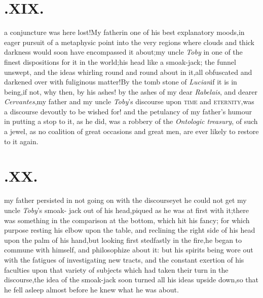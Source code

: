 \documentclass{article}
\begin{document}
\baselineskip

\section{.\quad  XIX.}

\baselineskip

 a conjuncture was\break
here lost!\tsh My father\break in one of his best explanatory
moods,\tsk in eager pursuit of a metaphysic point into the very
regions where clouds and thick darkness would soon have
encompassed it about;\tsk my uncle \textit{Toby} in one of the
finest dispositions for it in the world;\tsk his head like a
smoak-jack;\break
\tsh the funnel unswept, and the ideas
whirling round and round about in it,\break all obfuscated and darkened over with
fuliginous matter!\tsh By the tomb stone of \textit{Lucian}\tsh if it is in
being,\tsh if not, why then, by his ashes! by the ashes of my dear \textit{Rabelais},
and dearer \textit{Cervantes},\break\tsh my father and my uncle \textit{Toby}’s discourse
upon \textsc{time} and \textsc{eternity},\tsk was a discourse devoutly to be wished
for! and the petulancy of my father’s humour in putting a stop to it, as he did, was
a robbery of the \textit{Ontologic treasury}, of such a jewel, as no coalition of
great occasions and great men, are ever likely to restore to it again.

\section{.\quad  XX.}

 my father persisted in not going on
with the discourse\tsk yet he could not get my uncle
\textit{Toby}’s smoak- jack out of his head,\tsk piqued as he was
at first with it;\tsk there was something in the comparison at
the bottom, which hit his fancy; for which purpose resting his
elbow upon the table, and reclining the right side of his head
upon the palm of his hand,\tsh but looking first stedfast\-ly in
the fire,\tsh he began to commune with himself, and philosophize
about it: but his spirits being wore out with the fatigues of
investigating new tracts, and the constant exertion of his
faculties upon that variety of subjects which had taken their
turn in the discourse,\tsh the idea of the smoak-jack soon turned
all his ideas upside down,\tsk so that he fell asleep almost
before he knew what he was about.
\end{document}
